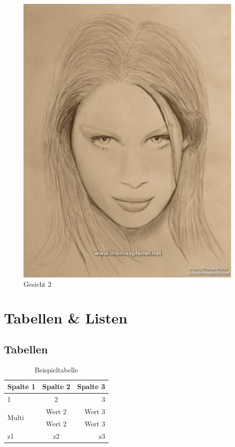 \begin{figure}[h]
\begin{minipage}[h]{5cm}
			\includegraphics[width=1\textwidth]{bilder/bilder.jpg}
		\caption{Gesicht 2}
		\label{fig:Gesicht2}
	\end{minipage}
\end{figure}

\lipsum[1]

\section{Tabellen \& Listen}
\label{sec:TabellenListen}

\subsection{Tabellen}
\label{sec:Tabellen}

\begin{table}[h]
	\centering
		\begin{tabular}{|l|c|r|}
			\hline
			\textbf{Spalte 1} & \textbf{Spalte 2} & \textbf{Spalte 3}\\
			\hline
			1 & 2 & 3 \\
			\hline
			\multirow{2}{*}{Multi}
				& Wert 2 & Wert 3 \\
				& Wert 2 & Wert 3 \\
			\hline
			z1 & z2 & z3 \\
			\hline
		\end{tabular}
	\caption{Beispieltabelle}
	\label{tab:Beispieltabelle}
\end{table}

